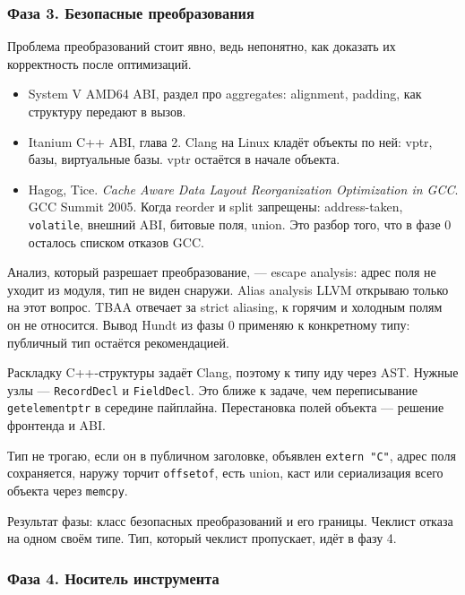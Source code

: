 \documentclass[a4paper,12pt]{article}
\begin{document}
\subsubsection{Фаза 3. Безопасные преобразования}

Проблема преобразований стоит явно, ведь непонятно, как доказать их корректность
после оптимизаций. 

\begin{ai}

\begin{itemize}
    \item System V AMD64 ABI, раздел про aggregates: alignment,
    padding, как структуру передают в вызов.
    \item Itanium C++ ABI, глава 2. Clang на Linux кладёт объекты по
    ней: vptr, базы, виртуальные базы. vptr остаётся в начале
    объекта.
    \item Hagog, Tice. \textit{Cache Aware Data Layout Reorganization
    Optimization in GCC}. GCC Summit 2005. Когда reorder и split
    запрещены: address-taken, \texttt{volatile}, внешний ABI,
    битовые поля, union. Это разбор того, что в фазе 0 осталось
    списком отказов GCC.
\end{itemize}

Анализ, который разрешает преобразование, --- escape analysis:
адрес поля не уходит из модуля, тип не виден снаружи. Alias analysis
LLVM открываю только на этот вопрос. TBAA отвечает за strict
aliasing, к горячим и холодным полям он не относится. Вывод Hundt из
фазы 0 применяю к конкретному типу: публичный тип остаётся
рекомендацией.

Раскладку C++-структуры задаёт Clang, поэтому к типу иду через AST.
Нужные узлы --- \texttt{RecordDecl} и \texttt{FieldDecl}. Это ближе к задаче, чем
переписывание \texttt{getelementptr} в середине пайплайна.
Перестановка полей объекта --- решение фронтенда и ABI.

Тип не трогаю, если он в публичном заголовке, объявлен
\texttt{extern "C"}, адрес поля сохраняется, наружу торчит
\texttt{offsetof}, есть union, каст или сериализация всего объекта
через \texttt{memcpy}.

\end{ai}

Результат фазы: класс безопасных преобразований и его границы.
Чеклист отказа на одном своём типе. Тип, который чеклист пропускает,
идёт в фазу 4.

\subsubsection{Фаза 4. Носитель инструмента}
\end{document}
